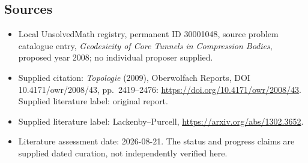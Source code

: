 \documentclass[11pt]{article}
\begin{document}
\subsection{Sources}
\begin{itemize}\item Local UnsolvedMath registry, permanent ID 30001048, source problem catalogue entry, \emph{Geodesicity of Core Tunnels in Compression Bodies}, proposed year 2008; no individual proposer supplied.\item Supplied citation: \emph{Topologie} (2009), Oberwolfach Reports, DOI 10.4171/owr/2008/43, pp.\ 2419--2476: \url{https://doi.org/10.4171/owr/2008/43}. Supplied literature label: original report.\item Supplied literature label: Lackenby--Purcell, \url{https://arxiv.org/abs/1302.3652}.\item Literature assessment date: 2026-08-21. The status and progress claims are supplied dated curation, not independently verified here.\end{itemize}
\end{document}
